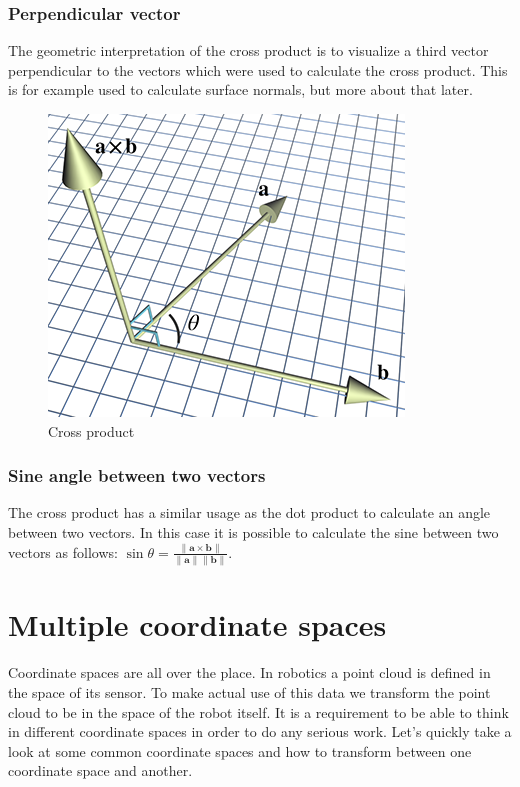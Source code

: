 \documentclass[a4paper,11pt]{article}
\begin{document}
\subsubsection{Perpendicular vector}

The geometric interpretation of the cross product is to visualize a third vector perpendicular to the vectors which were used to calculate the cross product. This is for example used to calculate surface normals, but more about that later.

\begin{figure}[H]
\centering
    \includegraphics{02_cross_product}
\caption{Cross product}
\label{fig:cross-product}
\end{figure}

\subsubsection{Sine angle between two vectors}

The cross product has a similar usage as the dot product to calculate an angle between two vectors. In this case it is possible to calculate the sine between two vectors as follows: $\sin\theta=\frac{\|\textbf{a}\times\textbf{b}\|}{\|\textbf{a}\|\|\textbf{b}\|}$.


\newpage
\section{Multiple coordinate spaces}

Coordinate spaces are all over the place. In robotics a point cloud is defined in the space of its sensor. To make actual use of this data we transform the point cloud to be in the space of the robot itself. It is a requirement to be able to think in different coordinate spaces in order to do any serious work. Let's quickly take a look at some common coordinate spaces and how to transform between one coordinate space and another.
\end{document}
